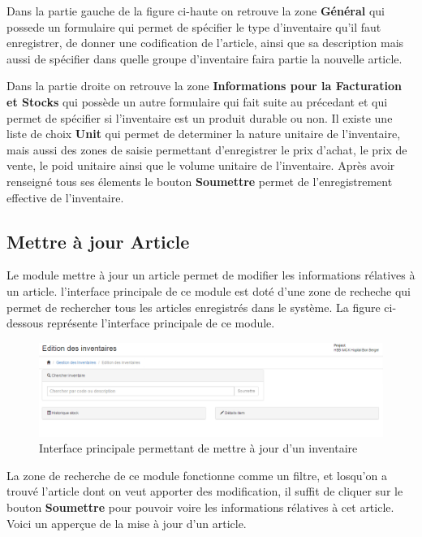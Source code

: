 \documentclass[12pt,a4paper]{report}
\begin{document}
Dans la partie gauche de la figure ci-haute on retrouve la zone \textbf{Général} qui possede un formulaire qui permet de spécifier le type d'inventaire qu'il faut enregistrer, de donner une codification de l'article, ainsi que sa description mais aussi de spécifier dans quelle groupe d'inventaire faira partie la nouvelle article. 

Dans la partie droite on retrouve la zone \textbf{Informations pour la Facturation et Stocks} qui possède un autre formulaire qui fait suite au précedant et qui permet de spécifier si l'inventaire est un produit durable ou non. Il existe une liste de choix \textbf{Unit} qui permet de determiner la nature unitaire de l'inventaire, mais aussi des zones de saisie permettant d'enregistrer le prix d'achat, le prix de vente, le poid unitaire ainsi que le volume unitaire de l'inventaire. Après avoir renseigné tous ses élements le bouton \textbf{Soumettre} permet de l'enregistrement effective de l'inventaire.


\subsection{Mettre à jour Article}
Le module mettre à jour un article permet de modifier les informations rélatives à un article. l'interface principale de ce module est doté d'une zone de recheche qui permet de rechercher tous les articles enregistrés dans le système.
La figure ci-dessous représente l'interface principale de ce module.

\begin{figure}[h]
\begin{center}
\includegraphics[width=14cm]{pic/EditInventaire.png}
\end{center}
\caption{Interface principale permettant de mettre à jour d'un inventaire}
\label{Interface principale permettant de mettre à jour d'un inventaire}
\end{figure}
\newpage
La zone de recherche de ce module fonctionne comme un filtre, et losqu'on a trouvé l'article dont on veut apporter des modification, il suffit de cliquer sur le bouton \textbf{Soumettre} pour pouvoir voire les informations rélatives à cet article. Voici un apperçue de la mise à jour d'un article.
\end{document}
